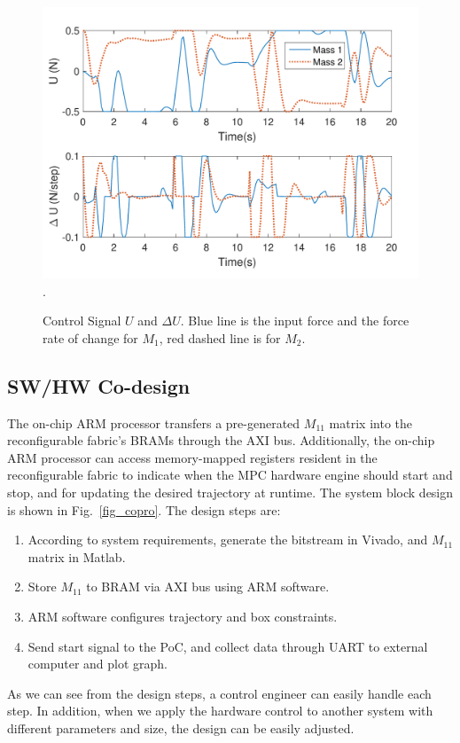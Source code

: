 \begin{figure}[t]
\centering
\captionsetup{justification=centering}
\includegraphics[scale=.45]{../figure/MU.pdf}
\DeclareGraphicsExtensions.
\caption{Control Signal $U$ and $\Delta U$. Blue line is the input force and the force rate of change for $M_1$, red dashed line is for $M_2$.\label{fig_mu}}
\end{figure}

\subsection{SW/HW Co-design}
The on-chip ARM processor transfers a pre-generated $M_{11}$ matrix into the reconfigurable fabric's BRAMs through the AXI bus. Additionally, the on-chip ARM processor can access memory-mapped registers resident in the reconfigurable fabric to indicate when the MPC hardware engine should start and stop, and for updating the desired trajectory at runtime.
The system block design is shown in Fig.~\ref{fig_copro}. The design steps are:
\begin{enumerate}
\item According to system requirements, generate the bitstream in Vivado, and $M_{11}$ matrix in Matlab.
\item Store $M_{11}$ to BRAM via AXI bus using ARM software.
\item ARM software configures trajectory and box constraints.
\item Send start signal to the PoC, and collect data through UART to external computer and plot graph.
\end{enumerate}\par
As we can see from the design steps, a control engineer can easily handle each step. In addition, when we apply the hardware control to another system with different parameters and size, the design can be easily adjusted.

